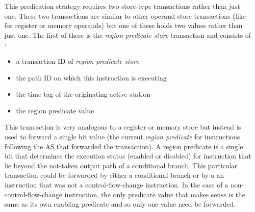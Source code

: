 \documentclass[10pt,dvips]{article}
\begin{document}
This predication strategy requires two store-type transactions
rather than just one.  These two transactions are similar
to other operand store transactions (like for register or memory
operands)
but one of these holds two values rather than just one.
The first of these is the \textit{region predicate store}
transaction and consists of :
%
\begin{itemize}
\vspace{-0.05in}
\item{a transaction ID of \textit{region predicate store}}
\vspace{-0.05in}
\item{the path ID on which this instruction is executing}
\vspace{-0.05in}
\item{the time tag of the originating active station}
\vspace{-0.05in}
\item{the region predicate value}
\vspace{-0.05in}
\end{itemize}   
%
This transaction is very analogous to a register or memory
store but instead is used to forward a single bit value (the
current \textit{region predicate} for instructions following the
AS that forwarded the transaction).  A region predicate
is a single bit that determines the execution status
(enabled or disabled) for instruction that lie beyond the
not-taken output path of a conditional branch.
This particular transaction could be forwarded by either
a conditional branch or by a an instruction that was not
a control-flow-change instruction.  In the
case of a non-control-flow-change instruction, the only
predicate value that makes sense is the same as its
own enabling predicate and so only one value need
be forwarded.
\end{document}

